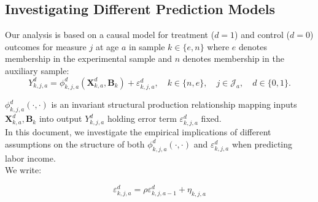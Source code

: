 


\usepackage[stable]{footmisc}

\newcommand*\leftright[2]{%
  \leavevmode
  \rlap{#1}%
  \hspace{0.5\linewidth}%
  #2}

\newcommand{\orth}{\ensuremath{\perp\!\!\!\perp}}%
\newcommand{\indep}{\orth}%
\newcommand{\notorth}{\ensuremath{\perp\!\!\!\!\!\!\diagup\!\!\!\!\!\!\perp}}%
\newcommand{\notindep}{\notorth}







\doublespacing

\subsection{Investigating Different Prediction Models} \label{appendix:predmodels}

\noindent Our analysis is based on a causal model for treatment ($d=1$) and control ($d=0$) outcomes for measure $j$ at age $a$ in sample $k \in \{e,n\}$ where $e$ denotes membership in the experimental sample and $n$ denotes membership in the auxiliary sample:\\

\begin{equation}\label{eq:outcome}
Y^d_{k,j,a} = \phi^d_{k,j,a} (\bm{X}^d_{k,a}, \bm{B}_k) + \varepsilon^d_{k,j,a}, \quad k \in \{n,e\}, \quad j \in \mathcal{J}_a, \quad d \in \{0, 1\}.
\end{equation}

\noindent $\phi^d_{k,j,a}\left( \cdot, \cdot \right)$ is an invariant structural production relationship mapping inputs $\bm{X}^d_{k,a}, \bm{B}_k$ into output $Y^d_{k,j,a}$ holding error term $\varepsilon^d_{k,j,a}$ fixed.\\ 

\noindent In this document, we investigate the empirical implications of different assumptions on the structure of both $\phi_{k,j,a}^d \left( \cdot, \cdot \right)$ and $\varepsilon_{k,j,a}^d$ when predicting labor income.\\ 

\noindent We write: 

\begin{equation}
\varepsilon^d_{k,j,a} = \rho \varepsilon^d_{k,j,{a-1}} + \eta_{k,j,{a}} \label{eq:error}
\end{equation}

